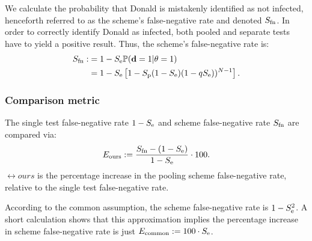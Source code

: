 \documentclass{article}
\begin{document}
We calculate the probability that Donald is mistakenly identified as
not infected, henceforth referred to as the scheme's false-negative
rate and denoted $S_{\text{fn}}$. In order to correctly identify Donald
as infected, both pooled and separate tests have to yield a positive
result. Thus, the scheme's false-negative rate is:
\begin{align}\label{eq:sfn}
    \begin{split}
        S_{\text{fn}} :&= 1 - S_\text{e}\mathbb{P}(\mathbf{d}=1|\theta=1)\\
        &= 1 - S_\text{e}\left [1 - S_\text{p}(1-S_\text{e})(1-qS_\text{e}))^{N-1}\right].
    \end{split}
\end{align}

\subsubsection{Comparison metric}
The single test false-negative rate $1-S_\text{e}$ and scheme false-negative
rate $S_{\text{fn}}$ are compared via:
\begin{equation}\label{eq:erel}
E_{\text{{ours}}} := \frac{S_{\text{fn}} - (1-S_\text{e})}{1-S_\text{e}} \cdot 100.
\end{equation}
$\rel{ours}$ is the percentage increase in the pooling scheme false-negative
rate, relative to the single test false-negative rate.

According to the common assumption, the scheme false-negative rate is
$1-S_\text{e}^2$. A short calculation shows that this approximation implies
the percentage increase in scheme false-negative rate is just
$E_{\text{{common}}} := 100\cdot S_\text{e}$.
\end{document}
